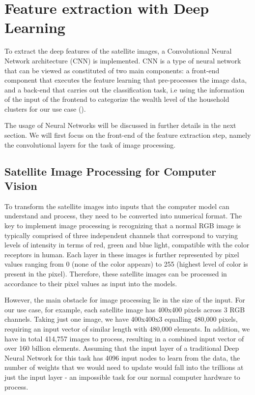\documentclass[solid,math,chem,code,plot,gloss]{bmc}
\begin{document}
\section{Feature extraction with Deep Learning}

To extract the deep features of the satellite images, a Convolutional Neural Network architecture (CNN) is implemented. CNN is a type of neural network that can be viewed as constituted of two main components: a front-end component that executes the feature learning that pre-processes the image data, and a back-end that carries out the classification task, i.e using the information of the input of the frontend to categorize the wealth level of the household clusters for our use case (\cite{Ferlitsch}).

The usage of Neural Networks will be discussed in further details in the next section. We will first focus on the front-end of the feature extraction step, namely the convolutional layers for the task of image processing.

\subsection{Satellite Image Processing for Computer Vision}

To transform the satellite images into inputs that the computer model can understand and process, they need to be converted into numerical format. The key to implement image processing is recognizing that a normal RGB image is typically comprised of three independent channels that correspond to varying levels of intensity in terms of red, green and blue light, compatible with the color receptors in human. Each layer in these images is further represented by pixel values ranging from 0 (none of the color appears) to 255 (highest level of color is present in the pixel). Therefore, these satellite images can be processed in accordance to their pixel values as input into the models. 

However, the main obstacle for image processing lie in the size of the input. For our use case, for example, each satellite image has 400x400 pixels across 3 RGB channels. Taking just one image, we have 400x400x3 equalling 480,000 pixels, requiring an input vector of similar length with 480,000 elements. In addition, we have in total 414,757 images to process, resulting in a combined input vector of over 160 billion elements. Assuming that the input layer of a traditional Deep Neural Network for this task has 4096 input nodes to learn from the data, the number of weights that we would need to update would fall into the trillions at just the input layer - an impossible task for our normal computer hardware to process. 
\end{document}

